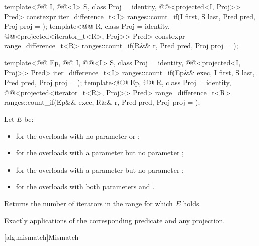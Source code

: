 \begin{itemdecl}
template<@@ I, @@<I> S, class Proj = identity,
         @@<projected<I, Proj>> Pred>
  constexpr iter_difference_t<I>
    ranges::count_if(I first, S last, Pred pred, Proj proj = {});
template<@@ R, class Proj = identity,
         @@<projected<iterator_t<R>, Proj>> Pred>
  constexpr range_difference_t<R>
    ranges::count_if(R&& r, Pred pred, Proj proj = {});

template<@@ Ep, @@ I, @@<I> S,
         class Proj = identity, @@<projected<I, Proj>> Pred>
  iter_difference_t<I>
    ranges::count_if(Ep&& exec, I first, S last, Pred pred, Proj proj = {});
template<@@ Ep, @@ R, class Proj = identity,
         @@<projected<iterator_t<R>, Proj>> Pred>
  range_difference_t<R>
    ranges::count_if(Ep&& exec, R&& r, Pred pred, Proj proj = {});
\end{itemdecl}

\begin{itemdescr}
\pnum
Let $E$ be:
\begin{itemize}
\item
   for the overloads
  with no parameter  or ;
\item
   for the overloads
  with a parameter  but no parameter ;
\item
   for the overloads
  with a parameter  but no parameter ;
\item
   for the overloads
  with both parameters  and .
\end{itemize}

\pnum
\effects
Returns the number of iterators  in the range 
for which $E$ holds.

\pnum
\complexity
Exactly  applications
of the corresponding predicate and any projection.
\end{itemdescr}

[alg.mismatch]{Mismatch}

